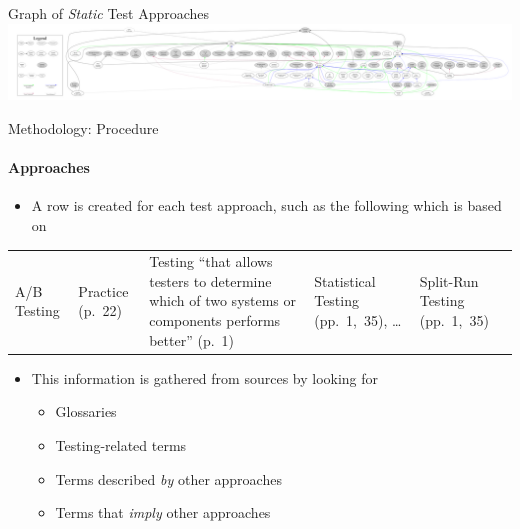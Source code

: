 \documentclass{beamer}
\begin{document}
\begin{frame}{Graph of \emph{Static} Test Approaches}
    \includegraphics[width=\textwidth]{assets/graphs/staticGraph.pdf}
\end{frame}

\begin{frame}{Methodology: Procedure}
    \framesubtitle{Approaches}
    \begin{itemize}
        \item A row is created for each test approach, such as the following which is based on \citep{IEEE2022}
    \end{itemize}
    \begin{center}
        \small
        \begin{tabularx}{\linewidth}{|M{1.1cm}|M{1.4cm}|X|M{1.7cm}|M{1.8cm}|}
            \hline
             &  &                                                                             &                &    \\
            \hline
            A/B Testing           & Practice (p.~22)          & Testing ``that allows testers to determine which of two systems or components performs better'' (p.~1) & Statistical Testing (pp.~1,~35), \dots{} & Split-Run Testing (pp.~1,~35) \\
            \hline
        \end{tabularx}
    \end{center}
    \pause
    \begin{itemize}
        \item This information is gathered from sources by looking for
              \begin{itemize}
                  \item Glossaries
                  \item Testing-related terms
                  \item Terms described \emph{by} other approaches
                  \item Terms that \emph{imply} other approaches
              \end{itemize}
    \end{itemize}
\end{frame}
\end{document}
